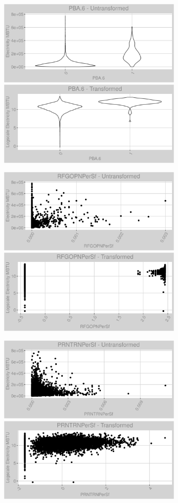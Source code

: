 \FloatBarrier
\newpage
\begin{figure}
\centering
\begin{subfigure}{1\textwidth}
\centering
\includegraphics[width=.49\textwidth, height=0.3\textheight]{Images/electricity_psf_var_original_15.png}
\includegraphics[width=.49\textwidth, height=0.3\textheight]{Images/electricity_psf_var_transformed_15.png}
\end{subfigure}
\begin{subfigure}{1\textwidth}
\centering
\includegraphics[width=.49\textwidth, height=0.3\textheight]{Images/electricity_psf_var_original_16.png}
\includegraphics[width=.49\textwidth, height=0.3\textheight]{Images/electricity_psf_var_transformed_16.png}
\end{subfigure}
\begin{subfigure}{1\textwidth}
\centering
\includegraphics[width=.49\textwidth, height=0.3\textheight]{Images/electricity_psf_var_original_17.png}
\includegraphics[width=.49\textwidth, height=0.3\textheight]{Images/electricity_psf_var_transformed_17.png}
\end{subfigure}
\end{figure}
